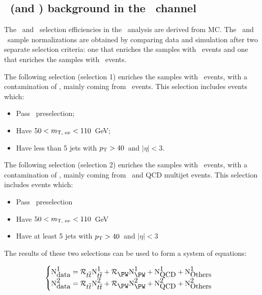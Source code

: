 %        
\subsection{\ttbar~(and \wjets) background in the \enujj~channel} 
\label{sec:enujjTTbarWJetsBkg}

The \ttbar~and \wjets~selection efficiencies in the \enujj~analysis are derived from MC.
The \ttbar~and \wjets~sample normalizations are obtained by comparing data and simulation
after two separate selection criteria: one that enriches the samples with \ttbar~events 
and one that enriches the samples with \wjets~events.

The following selection (selection 1) enriches the samples with \wjets~events, with a contamination of \ContaminationAtWpeak, 
mainly coming from \ttbar~events.  This selection includes events which:
\begin{itemize}
\item Pass \enujj~preselection;
\item Have $50<m_{\text{T, e}\nu}<110$~GeV;
\item Have less than 5 jets with $p_{\text{T}}>40$~\GeV and $|\eta|<3$.
\end{itemize}

The following selection (selection 2) enriches the samples with \ttbar~events, with a contamination of \ContaminationAtTTBARenujj, mainly coming from \wjets~and QCD multijet events.  This selection includes events which:
\begin{itemize}
\item Pass \enujj~preselection
\item Have $50<m_{\text{T, e}\nu}<110$~GeV
\item Have at least 5 jets with $p_{\text{T}}>40$~\GeV and $|\eta|<3$
\end{itemize}

The results of these two selections can be used to form a system of equations:

\begin{equation}
\begin{cases}
\mbox{N}_{\mbox{data}}^{\mbox{1}} = \mathcal{R}_{\mbox{\ttbar}} \mbox{N}_{\mbox{\ttbar}}^{\mbox{1}} + \mathcal{R}_{\mbox{\PW}}\mbox{N}_{\mbox{\PW}}^{\mbox{1}} + \mbox{N}_{\mbox{QCD}}^{\mbox{1}}  +  \mbox{N}_{\mbox{Others}}^{\mbox{1}} \\
\mbox{N}_{\mbox{data}}^{\mbox{2}} = \mathcal{R}_{\mbox{\ttbar}} \mbox{N}_{\mbox{\ttbar}}^{\mbox{2}} + \mathcal{R}_{\mbox{\PW}}\mbox{N}_{\mbox{\PW}}^{\mbox{2}} + \mbox{N}_{\mbox{QCD}}^{\mbox{2}}  +  \mbox{N}_{\mbox{Others}}^{\mbox{2}} 
\end{cases}
\end{equation}

